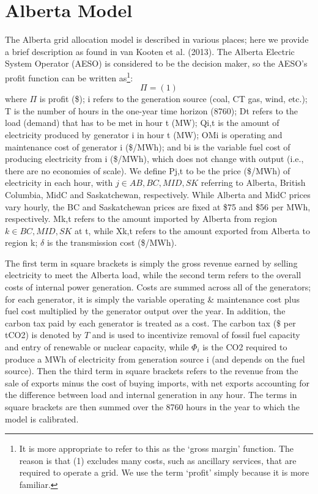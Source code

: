 \section{Alberta Model}
\label{sec:Alberta Model}

The Alberta grid allocation model is described in various places; here we provide a brief description as found in van Kooten et al. (2013). The Alberta Electric System Operator (AESO) is considered to be the decision maker, so the AESO’s profit function can be written as\footnote{It is more appropriate to refer to this as the ‘gross margin’ function. The reason is that (1) excludes many costs, such as ancillary services, that are required to operate a grid. We use the term ‘profit’ simply because it is more familiar. }: 
\[\Pi =  	(1)\]
where $\Pi$ is profit (\$); i refers to the generation source (coal, CT gas, wind, etc.); T is the number of hours in the one-year time horizon (8760); Dt refers to the load (demand) that has to be met in hour t (MW); Qi,t is the amount of electricity produced by generator i in hour t (MW); OMi is operating and maintenance cost of generator i (\$/MWh); and bi is the variable fuel cost of producing electricity from i (\$/MWh), which does not change with output (i.e., there are no economies of scale). We define Pj,t to be the price (\$/MWh) of electricity in each hour, with $j \in {AB, BC, MID, SK}$ referring to Alberta, British Columbia, MidC and Saskatchewan, respectively. While Alberta and MidC prices vary hourly, the BC and Saskatchewan prices are fixed at \$75 and \$56 per MWh, respectively. Mk,t refers to the amount imported by Alberta from region $k \in {BC, MID, SK}$ at t, while Xk,t refers to the amount exported from Alberta to region k; $\delta$ is the transmission cost (\$/MWh). 



The first term in square brackets is simply the gross revenue earned by selling electricity to meet the Alberta load, while the second term refers to the overall costs of internal power generation. Costs are summed across all of the generators; for each generator, it is simply the variable operating \& maintenance cost plus fuel cost multiplied by the generator output over the year. In addition, the carbon tax paid by each generator is treated as a cost. The carbon tax (\$ per tCO2) is denoted by $T$ and is used to incentivize removal of fossil fuel capacity and entry of renewable or nuclear capacity, while $\Phi_i$ is the CO2 required to produce a MWh of electricity from generation source i (and depends on the fuel source). Then the third term in square brackets refers to the revenue from the sale of exports minus the cost of buying imports, with net exports accounting for the difference between load and internal generation in any hour. The terms in square brackets are then summed over the 8760 hours in the year to which the model is calibrated. 



